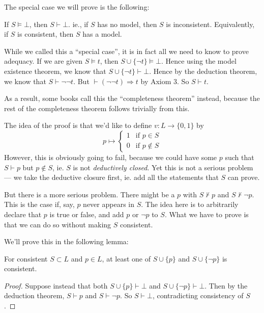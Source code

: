 \documentclass[a4paper]{article}
\begin{document}
The special case we will prove is the following:
\begin{thm}
  If $S\models \bot$, then $S\vdash \bot$. ie., if $S$ has no model, then $S$ is inconsistent. Equivalently, if $S$ is consistent, then $S$ has a model.

\end{thm}

While we called this a ``special case'', it is in fact all we need to know to prove adequacy. If we are given $S\models t$, then $S\cup \{\neg t\} \models \bot$. Hence using the model existence theorem, we know that $S\cup \{\neg t\} \vdash \bot$. Hence by the deduction theorem, we know that $S\vdash \neg \neg t$. But $\vdash (\neg\neg t)\Rightarrow t$ by Axiom 3. So $S\vdash t$.

As a result, some books call this the ``completeness theorem'' instead, because the rest of the completeness theorem follows trivially from this.

The idea of the proof is that we'd like to define $v: L \to \{0, 1\}$ by
\[
  p\mapsto
  \begin{cases}
    1 & \text{if } p\in S\\
    0 & \text{if } p\not\in S
  \end{cases}
\]
However, this is obviously going to fail, because we could have some $p$ such that $S\vdash p$ but $p\not\in S$, ie. $S$ is not \emph{deductively closed}. Yet this is not a serious problem --- we take the deductive closure first, ie. add all the statements that $S$ can prove.

But there is a more serious problem. There might be a $p$ with $S\not\vdash p$ and $S\not\vdash \neg p$. This is the case if, say, $p$ never appears in $S$. The idea here is to arbitrarily declare that $p$ is true or false, and add $p$ or $\neg p$ to $S$. What we have to prove is that we can do so without making $S$ consistent.

We'll prove this in the following lemma:
\begin{lemma}
  For consistent $S\subset L$ and $p\in L$, at least one of $S\cup \{p\}$ and $S\cup \{\neg p\}$ is consistent.
\end{lemma}

\begin{proof}
  Suppose instead that both $S\cup \{p\} \vdash \bot$ and $S\cup \{\neg p\}\vdash \bot$. Then by the deduction theorem, $S\vdash p$ and $S\vdash \neg p$. So $S\vdash \bot$, contradicting consistency of $S$.
\end{proof}
\end{document}
